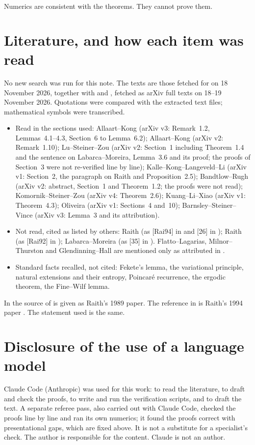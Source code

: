 \documentclass[11pt]{amsart}
\theoremstyle{definition}
\theoremstyle{remark}
\begin{document}
Numerics are consistent with the theorems. They cannot prove them.

\section{Literature, and how each item was read}\label{sec:lit}

No new search was run for this note. The texts are those fetched for \cite{Nem26} on 18 November 2026, together with \cite{BR} and \cite{KKLL}, fetched as arXiv full texts on 18--19 November 2026. Quotations were compared with the extracted text files; mathematical symbols were transcribed.
\begin{itemize}
\item Read in the sections used: Allaart--Kong \cite{AKgen} (arXiv v3: Remark~1.2, Lemmas~4.1--4.3, Section~6 to Lemma~6.2); Allaart--Kong \cite{AKcrit} (arXiv v2: Remark~1.10); Lu--Steiner--Zou \cite{LSZ} (arXiv v2: Section~1 including Theorem~1.4 and the sentence on Labarca--Moreira, Lemma~3.6 and its proof; the proofs of Section~3 were not re-verified line by line); Kalle--Kong--Langeveld--Li \cite{KKLL} (arXiv v1: Section~2, the paragraph on Raith and Proposition~2.5); Bandtlow--Rugh \cite{BR} (arXiv v2: abstract, Section~1 and Theorem~1.2; the proofs were not read); Komornik--Steiner--Zou \cite{KSZ} (arXiv v4: Theorem~2.6); Kuang--Li--Xiao \cite{KLX} (arXiv v1: Theorem~4.3); Oliveira \cite{Oliveira} (arXiv v1: Sections~4 and~10); Barnsley--Steiner--Vince \cite{BSV} (arXiv v3: Lemma~3 and its attribution).
\item Not read, cited as listed by others: Raith \cite{Raith94} (as [Rai94] in \cite{KKLL} and [26] in \cite{AKgen}); Raith \cite{Raith92} (as [Rai92] in \cite{KKLL}); Labarca--Moreira \cite{LM} (as [35] in \cite{LSZ}). Flatto--Lagarias, Milnor--Thurston and Glendinning--Hall are mentioned only as attributed in \cite{BSV}.
\item Standard facts recalled, not cited: Fekete's lemma, the variational principle, natural extensions and their entropy, Poincar\'e recurrence, the ergodic theorem, the Fine--Wilf lemma.
\end{itemize}
In \cite[proof of Corollary~7.2]{Nem26} the source of \cite[Lemma~6.2]{AKgen} is given as Raith's 1989 paper. The reference in \cite{AKgen} is Raith's 1994 paper \cite{Raith94}. The statement used is the same.

\section*{Disclosure of the use of a language model}
Claude Code (Anthropic) was used for this work: to read the literature, to draft and check the proofs, to write and run the verification scripts, and to draft the text. A separate referee pass, also carried out with Claude Code, checked the proofs line by line and ran its own numerics; it found the proofs correct with presentational gaps, which are fixed above. It is not a substitute for a specialist's check. The author is responsible for the content. Claude is not an author.
\end{document}
